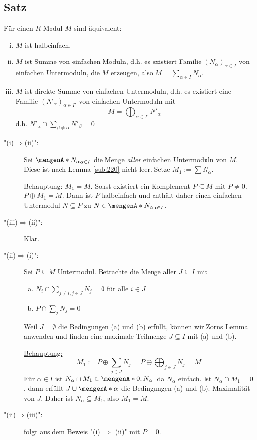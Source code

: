 \subsection[Satz: Äquivalenzen zu halbeinfach durch Summen aus einfachen Untermoduln]{Satz} %
\label{sub:219}
Für einen $R$-Modul $M$ sind äquivalent:
\begin{enumerate}[(i)]
	\item $M$ ist halbeinfach.
	\item $M$ ist Summe von einfachen Moduln, d.h. es existiert Familie $(N_\alpha)_{\alpha \in I}$ von einfachen Untermoduln, die $M$ erzeugen, also 
	$M = \sum_{\alpha \in I} N_\alpha$.
	\item $M$ ist direkte Summe von einfachen Untermoduln, d.h. es existiert eine Familie $(N'_\alpha)_{\alpha \in I'}$ von einfachen Untermoduln mit 
	\[
		M = \bigoplus_{\alpha \in I'} N'_\alpha
	\]
	d.h. $N'_\alpha \cap \sum_{\beta \not= \alpha} N'_\beta = 0$
\end{enumerate}
\begin{description}
	\item["(i)$\Rightarrow$(ii)":] Sei $\set{N_\alpha}_{\alpha\in I}$ die Menge \emph{aller} einfachen Untermoduln von $M$. Diese ist nach Lemma \ref{sub:220} nicht leer. 
	Setze $M_1 := \sum N_\alpha$.
	
	\uline{Behauptung:} $M_1 = M$. Sonst existiert ein Komplement $P \subseteq M$ mit $P \not= 0$, $P \oplus M_1 = M$. Dann ist $P$ halbeinfach und enthält daher einen 
	einfachen Untermodul $N \subseteq P$ \light zu $N \in \set{N_\alpha}_{\alpha \in I}$.
	\item["(iii)$\Rightarrow $(ii)":] Klar.
	\item["(ii)$\Rightarrow $(i)":] Sei $P \subseteq M$ Untermodul. Betrachte die Menge aller $J \subseteq I$ mit 
	\begin{enumerate}[(a)]
		\item $N_i \cap \sum_{j \not= i, j \in J} N_j = 0$ für alle $i \in J$
		\item $P \cap \sum_j N_j = 0$
	\end{enumerate}
	Weil $J = \emptyset$ die Bedingungen (a) und (b) erfüllt, können wir Zorns Lemma anwenden und finden eine maximale Teilmenge $J \subseteq I$ mit (a) und (b).
	
	\uline{Behauptung:} 
	\[
		M_1 := P \oplus \sum_{j \in J} N_j = P \oplus \bigoplus_{j \in J} N_j = M
	\]
	Für $\alpha \in I$ ist $N_\alpha \cap M_1 \in\set{0, N_\alpha}$, da $N_\alpha$ einfach. Ist $N_\alpha \cap M_1 = 0$, dann erfüllt $J \cup \set{\alpha}$ die Bedingungen
	(a) und (b). \light Maximalität von $J$. Daher ist $N_\alpha \subseteq M_1$, also $M_1 = M$.
	\item["(ii)$\Rightarrow $(iii)":] folgt aus dem Beweis "(i) $\Rightarrow$ (ii)"{} mit $P=0$. \bewende
\end{description}

